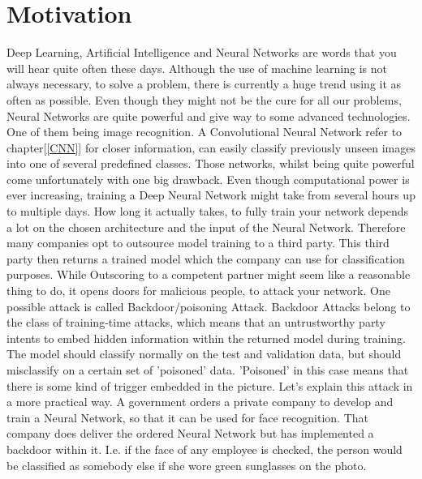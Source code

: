 \documentclass[a4paper,12pt]{report}
\begin{document}
\chapter{Motivation}
Deep Learning, Artificial Intelligence and Neural Networks are words that you will hear quite often these days. Although the use of machine learning is not always necessary, to solve a problem, there is currently a huge trend using it as often as possible. Even though they might not be the cure for all our problems, Neural Networks are quite powerful and give way to some advanced technologies. One of them being image recognition. A Convolutional Neural Network refer to chapter[\ref{CNN}] for closer information, can easily classify previously unseen images into one of several predefined classes. Those networks, whilst being quite powerful come unfortunately with one big drawback. Even though computational power is ever increasing, training a Deep Neural Network might take from several hours up to multiple days. How long it actually takes, to fully train your network depends a lot on the chosen architecture and the input of the Neural Network. Therefore many companies opt to outsource model training to a third party. This third party then returns a trained model which the company can use for classification purposes. While Outscoring to a competent partner might seem like a reasonable thing to do, it opens doors for malicious people, to attack your network. One possible attack is called Backdoor/poisoning Attack. 
Backdoor Attacks belong to the class of training-time attacks, which means that an untrustworthy party intents to embed hidden information within the returned model during training. The model should classify normally on the test and validation data, but should misclassify on a certain set of 'poisoned' data. 'Poisoned' in this case means that there is some kind of trigger embedded in the picture.
Let's explain this attack in a more practical way. A government orders a private company to develop and train a Neural Network, so that it can be used for face recognition. That company does deliver the ordered Neural Network but has implemented a backdoor within it. I.e. if the face of any employee is checked, the person would be classified as somebody else if she wore green sunglasses on the photo.
\end{document}
